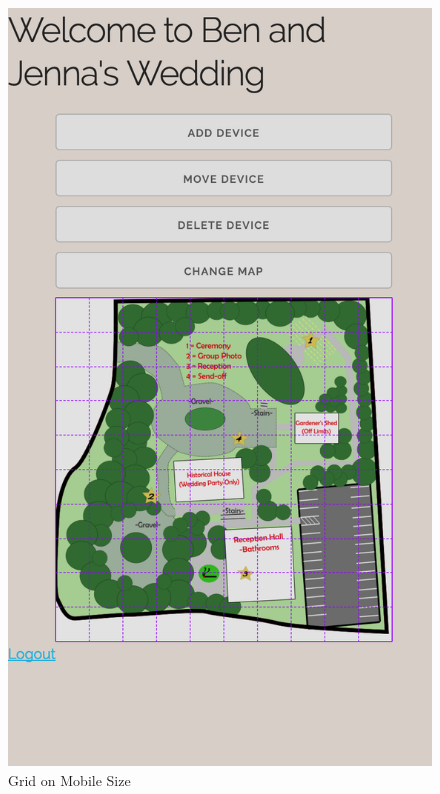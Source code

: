 \documentclass[onecolumn, draftclsnofoot,10pt, compsoc]{IEEEtran}
\begin{document}
        \begin{figure}[H]
            \centering
            \captionsetup{justification=centering,margin=2cm}
            \includegraphics[scale=0.24]{Images/admin-view-mobile-grid.png}
            \centering\caption{Grid on Mobile Size}
            \label{fig:Change}
        \end{figure}
    
\end{document}
